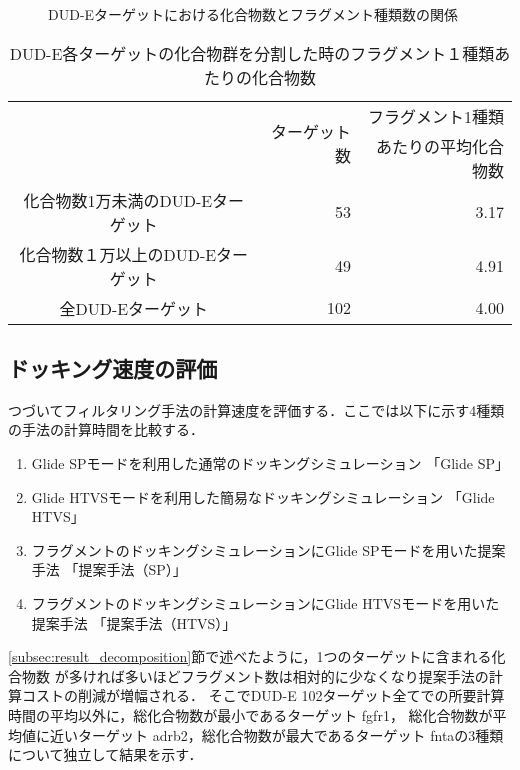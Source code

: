 \begin{figure}[bhtp]
 \begin{center}
	\vspace{-0.5cm}
  \caption{DUD-Eターゲットにおける化合物数とフラグメント種類数の関係}
  \label{fig:dude_decomposition}
 \end{center}
\end{figure}
\begin{table}[htb] \centering
	\caption{DUD-E各ターゲットの化合物群を分割した時のフラグメント１種類あたりの化合物数}
	\label{table:dude_decomposition}
	\begin{tabular}{c|rr}
	\hline
								&\multirow{2}{*}{ターゲット数}	&フラグメント1種類			\\
								&						&あたりの平均化合物数		\\ 
	\hline
	化合物数1万未満のDUD-Eターゲット		&53			&3.17							\\
	化合物数１万以上のDUD-Eターゲット		&49			&4.91							\\ 
	\hline
	全DUD-Eターゲット						&102		&4.00							\\ 
	\hline
	\end{tabular}
\end{table}


\subsection{ドッキング速度の評価}\label{subsec:single_calc_time}
つづいてフィルタリング手法の計算速度を評価する．ここでは以下に示す4種類の手法の計算時間を比較する．
\begin{enumerate}
\item Glide SPモードを利用した通常のドッキングシミュレーション 「Glide SP」
\item Glide HTVSモードを利用した簡易なドッキングシミュレーション 「Glide HTVS」
\item フラグメントのドッキングシミュレーションにGlide SPモードを用いた提案手法 「提案手法（SP）」
\item フラグメントのドッキングシミュレーションにGlide HTVSモードを用いた提案手法 「提案手法（HTVS）」
\end{enumerate}

\ref{subsec:result_decomposition}節で述べたように，1つのターゲットに含まれる化合物数
が多ければ多いほどフラグメント数は相対的に少なくなり提案手法の計算コストの削減が増幅される．
そこでDUD-E 102ターゲット全てでの所要計算時間の平均以外に，総化合物数が最小であるターゲット fgfr1，
総化合物数が平均値に近いターゲット adrb2，総化合物数が最大であるターゲット fntaの3種類について独立して結果を示す．

